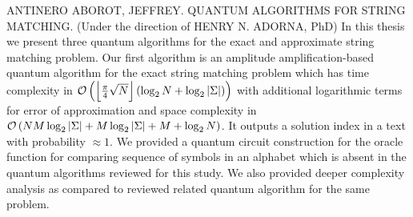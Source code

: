 

ANTINERO ABOROT, JEFFREY. \uppercase{Quantum algorithms for string matching}. (Under the direction of HENRY N. ADORNA, PhD)
In this thesis we present three quantum algorithms for the exact and approximate string matching problem. Our first algorithm is an amplitude amplification-based quantum algorithm for the exact string matching problem which has time complexity in $\mathcal{O}\left( \left\lfloor \frac{\pi}{4}\sqrt{N} \right\rfloor \left( \log_2 N + \log_2 \vert \Sigma \vert \right) \right)$ with additional logarithmic terms for error of approximation and space complexity in $\mathcal{O}\left( NM\log_2\vert \Sigma \vert + M\log_2 \vert \Sigma \vert + M + \log_2 N \right)$. It outputs a solution index in a text with probability $\approx 1$. We provided a quantum circuit construction for the oracle function for comparing sequence of symbols in an alphabet which is absent in the quantum algorithms reviewed for this study. We also provided deeper complexity analysis as compared to reviewed related quantum algorithm for the same problem. 

